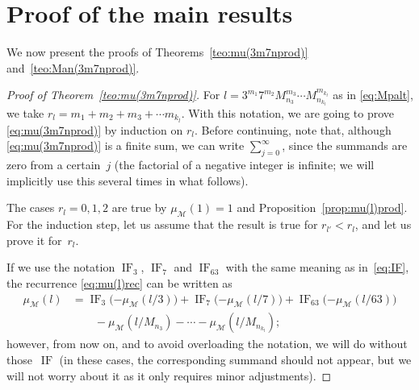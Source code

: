 \documentclass[11pt, a4paper]{article}
\newcommand{\calM}{\mathcal{M}}
\newcommand{\muM}{\mu_\calM}
\newcommand{\IF}{\operatorname{IF}}
\theoremstyle{plain}
\theoremstyle{definition}
\begin{document}
\section{Proof of the main results}
\label{sec:main}

We now present the proofs of Theorems~\ref{teo:mu(3m7nprod)} and~\ref{teo:Man(3m7nprod)}.

\begin{proof}[Proof of Theorem~\ref{teo:mu(3m7nprod)}]
For $l = 3^{m_1} 7^{m_2} M_{n_3}^{m_3} \cdots M_{n_{k_l}}^{m_{k_l}}$ as in \eqref{eq:Mpalt}, we take $r_l = m_1 + m_2 + m_3 + \cdots m_{k_l}$. With this notation, we are going to prove \eqref{eq:mu(3m7nprod)} by induction on $r_l$.
Before continuing, note that, although \eqref{eq:mu(3m7nprod)} is a finite sum, we can write $\sum_{j=0}^{\infty}$, since the summands are zero from a certain~$j$ (the factorial of a negative integer is infinite; we will implicitly use this several times in what follows).

The cases $r_l = 0,1,2$ are true by $\muM(1)=1$ and Proposition~\ref{prop:mu(l)prod}. 
For the induction step, let us assume that the result is true for $r_{l'} < r_l$, and let us prove it for~$r_l$.

If we use the notation $\IF_{3}$, $\IF_{7}$ and $\IF_{63}$ with the same meaning as in~\eqref{eq:IF}, the recurrence \eqref{eq:mu(l)rec} can be written as
\begin{align*}
  \muM(l) &= \IF_3\bigl({-\muM(l/3)}\bigr) + \IF_7\bigl({-\muM(l/7)}\bigr) + \IF_{63}\bigl({-\muM(l/63)}\bigr) \\
  &\qquad - \muM(l/M_{n_3}) - \cdots - \muM(l/M_{n_{k_l}});
\end{align*}
however, from now on, and to avoid overloading the notation, we will do without those~$\IF$ (in these cases, the corresponding summand should not appear, but we will not worry about it as it only requires minor adjustments). 


\end{proof}
\end{document}
